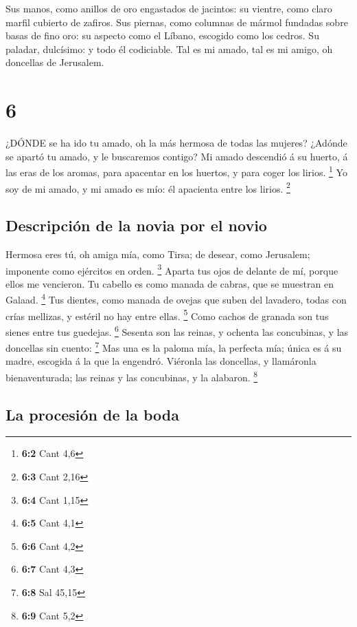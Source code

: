  Sus manos, como anillos de oro engastados de jacintos: su
vientre, como claro marfil cubierto de zafiros.  Sus
piernas, como columnas de mármol fundadas sobre basas de fino oro: su
aspecto como el Líbano, escogido como los cedros.  Su
paladar, dulcísimo: y todo él codiciable. Tal es mi amado, tal es mi
amigo, oh doncellas de Jerusalem.

\hypertarget{section-5}{%
\section{6}\label{section-5}}

 ¿DÓNDE se ha ido tu amado, oh la más hermosa de todas las
mujeres? ¿Adónde se apartó tu amado, y le buscaremos contigo?
 Mi amado descendió á su huerto, á las eras de los aromas,
para apacentar en los huertos, y para coger los lirios. \footnote{\textbf{6:2}
  Cant 4,6}  Yo soy de mi amado, y mi amado es mío: él
apacienta entre los lirios. \footnote{\textbf{6:3} Cant 2,16}

\hypertarget{descripciuxf3n-de-la-novia-por-el-novio-1}{%
\subsection{Descripción de la novia por el
novio}\label{descripciuxf3n-de-la-novia-por-el-novio-1}}

 Hermosa eres tú, oh amiga mía, como Tirsa; de desear, como
Jerusalem; imponente como ejércitos en orden. \footnote{\textbf{6:4}
  Cant 1,15}  Aparta tus ojos de delante de mí, porque ellos
me vencieron. Tu cabello es como manada de cabras, que se muestran en
Galaad. \footnote{\textbf{6:5} Cant 4,1}  Tus dientes, como
manada de ovejas que suben del lavadero, todas con crías mellizas, y
estéril no hay entre ellas. \footnote{\textbf{6:6} Cant 4,2}
 Como cachos de granada son tus sienes entre tus guedejas.
\footnote{\textbf{6:7} Cant 4,3}  Sesenta son las reinas, y
ochenta las concubinas, y las doncellas sin cuento: \footnote{\textbf{6:8}
  Sal 45,15}  Mas una es la paloma mía, la perfecta mía;
única es á su madre, escogida á la que la engendró. Viéronla las
doncellas, y llamáronla bienaventurada; las reinas y las concubinas, y
la alabaron. \footnote{\textbf{6:9} Cant 5,2}

\hypertarget{la-procesiuxf3n-de-la-boda}{%
\subsection{La procesión de la boda}\label{la-procesiuxf3n-de-la-boda}}

